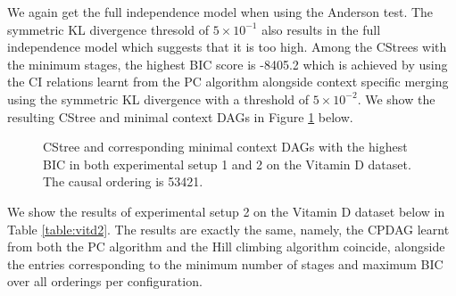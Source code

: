 \documentclass{tufte-book}
\begin{document}
We again get the full independence model when using the Anderson test. The symmetric KL divergence thresold of \(5\times 10^{-1}\) also results in the full independence model which suggests that it is too high. Among the CStrees with the minimum stages, the highest BIC score is -8405.2 which is achieved by using the CI relations learnt from the PC algorithm alongside context specific merging using the symmetric KL divergence with a threshold of \(5 \times 10^{-2}\). We show the resulting CStree and minimal context DAGs in Figure \ref{fig:vitdmaxbic} below.

\begin{figure}[]\label{fig:vitdmaxbic}
   \begin{floatrow}
%
\caption{CStree and corresponding minimal context DAGs with the highest BIC in both experimental setup 1 and 2 on the Vitamin D dataset. The causal ordering is 53421. }
        
   \end{floatrow}
\end{figure}

We show the results of experimental setup 2 on the Vitamin D dataset below in Table \ref{table:vitd2}. The results are exactly the same, namely, the CPDAG learnt from both the PC algorithm and the Hill climbing algorithm coincide, alongside the entries corresponding to the minimum number of stages and maximum BIC over all orderings per configuration.
\end{document}
